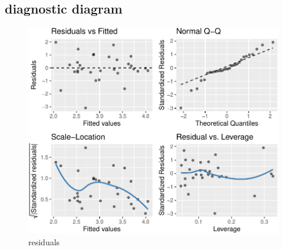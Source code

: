 \documentclass[11pt,a4paper,]{article}
\begin{document}
\subsection{diagnostic diagram}
\begin{figure}[H]

{\centering \includegraphics{Figures/unnamed-chunk-7-1} 

}

\caption{residuals}\label{fig:unnamed-chunk-7}
\end{figure}
\providecommand{\docline}[3]{\noalign{\global\setlength{\arrayrulewidth}{#1}}\arrayrulecolor[HTML]{#2}\cline{#3}}

\setlength{\tabcolsep}{2pt}

\renewcommand*{\arraystretch}{1.5}
\end{document}
